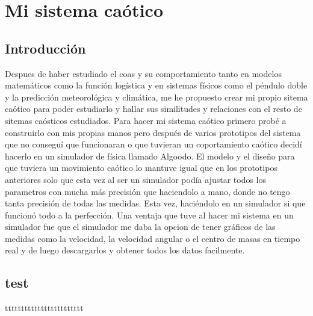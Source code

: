 \documentclass[
  11pt,
  a4paper,
  DIV=11,
  numbers=noendperiod]{scrreprt}
\begin{document}
\part{Mi sistema caótico}

\chapter{Introducción}\label{introducciuxf3n-6}

Despues de haber estudiado el coas y su comportamiento tanto en modelos
matemáticos como la función logística y en sistemas físicos como el
péndulo doble y la predicción meteorológica y climática, me he propuesto
crear mi propio sitema caótico para poder estudiarlo y hallar sus
similitudes y relaciones con el resto de sitemas caósticos estudiados.
Para hacer mi sistema caótico primero probé a construirlo con mis
propias manos pero después de varios prototipos del sistema que no
conseguí que funcionaran o que tuvieran un coportamiento caótico decidí
hacerlo en un simulador de física llamado Algoodo. El modelo y el diseño
para que tuviera un movimiento caótico lo mantuve igual que en los
prototipos anteriores solo que esta vez al ser un simulador podía
ajustar todos los parametros con mucha más precisión que haciendolo a
mano, donde no tengo tanta precisión de todas las medidas. Esta vez,
haciéndolo en un simulador si que funcionó todo a la perfección. Una
ventaja que tuve al hacer mi sistema en un simulador fue que el
simulador me daba la opcion de tener gráficos de las medidas como la
velocidad, la velocidad angular o el centro de masas en tiempo real y de
luego descargarlos y obtener todos los datos facilmente.

\chapter{test}\label{test}

tttttttttttttttttttttttt
\end{document}
